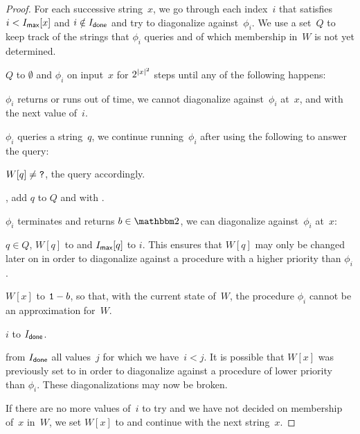\begin{proof}
  For each successive string~$x$, we go through each index~$i$ that satisfies $i < I_\textsf{max}[x]$ and $i \notin I_\textsf{done}$ and try to diagonalize against~$\phi_i$.
  We use a set~$Q$ to keep track of the strings that $\phi_i$ queries and of which membership in~$W$ is not yet determined.
  \begin{codelisting}
  \item
     $Q$ to $\emptyset$ and  $\phi_i$ on input~$x$ for $2^{\length{x}^2}$ steps until any of the following happens:
    \begin{codelisting}
    \item
       $\phi_i$ returns  or runs out of time, we cannot diagonalize against~$\phi_i$ at~$x$, and  with the next value of~$i$.
    \item
       $\phi_i$ queries a string~$q$, we continue running~$\phi_i$ after using the following to answer the query:
      \begin{codelisting}
      \item
         $W[q] \neq \bits{?}$,  the query accordingly.
      \item
        , add $q$ to $Q$ and  with .
      \end{codelisting}
    \item
       $\phi_i$ terminates and returns $b \in \binary$, we can diagonalize against~$\phi_i$ at~$x$:
      \begin{codelisting}
      \item
         $q \in Q$,  $W[q]$ to  and  $I_\code{max}[q]$ to $i$.
        This ensures that $W[q]$ may only be changed later on in order to diagonalize against a procedure with a higher priority than $\phi_i$.
      \item\label{code:nonreducible:diagonalize}%
         $W[x]$ to $\bits{1} - b$, so that, with the current state of~$W$, the procedure $\phi_i$ cannot be an approximation for~$W$.
      \item
         $i$ to $I_\code{done}$.
      \item
         from $I_\code{done}$ all values~$j$ for which we have~$i < j$.
        It is possible that $W[x]$ was previously set to  in order to diagonalize against a procedure of lower priority than $\phi_i$.
        These diagonalizations may now be broken.
      \end{codelisting}
    \end{codelisting}
  \end{codelisting}
  If there are no more values of~$i$ to try and we have not decided on membership of~$x$ in~$W$, we set $W[x]$ to  and continue with the next string~$x$.


\end{proof}
